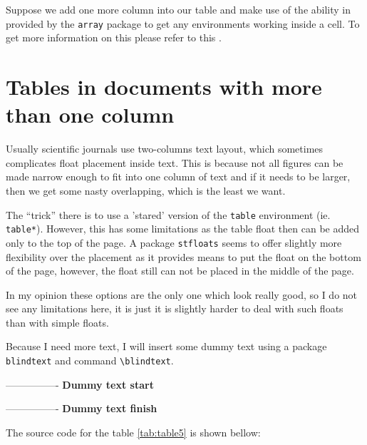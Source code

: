 Suppose we add one more column into our table and make use of the ability in
provided by the \verb|array| package to get any environments working inside a
cell. To get more information on this please refer to this 
.




\section{Tables in documents with more than one column}

\begin{multicols}{2}
    

    Usually scientific journals use two-columns text layout, which sometimes
    complicates float placement inside text. This is because not all figures can
    be made narrow enough to fit into one column of text and if it needs to be
    larger, then we get some nasty overlapping, which is the least we want.

    The ``trick'' there is to use a 'stared' version of the \verb|table|
    environment (ie. \verb|table*|). However, this has some limitations as the
    table float then can be added only to the top of the page. A package
    \verb|stfloats| seems to offer slightly more flexibility over the placement
    as it provides means to put the float on the bottom of the page, however,
    the float still can not be placed in the middle of the page.

    In my opinion these options are the only one which look really good, so I do
    not see any limitations here, it is just it is slightly harder to deal with
    such floats than with simple floats.

    Because I need more text, I will insert some dummy text using a package
    \verb|blindtext| and command \verb|\blindtext|.

    ----------------
    \textbf{Dummy text start}

    \blindtext

    \blindtext

    ----------------
    \textbf{Dummy text finish}
\end{multicols}

The source code for the table \ref{tab:table5} is shown bellow:






